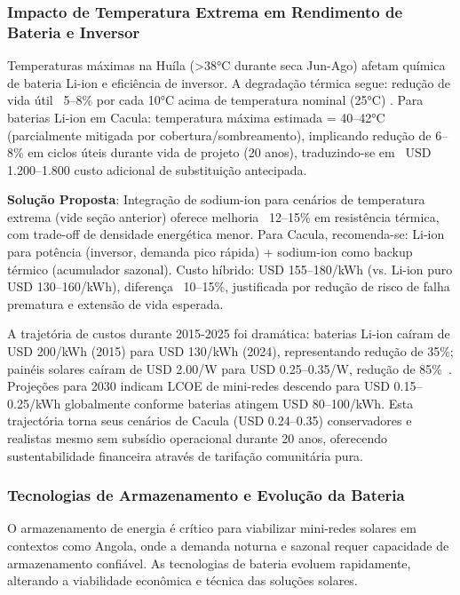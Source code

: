 \documentclass[12pt, a4paper]{article}
\begin{document}
\subsubsection{Impacto de Temperatura Extrema em Rendimento de Bateria e Inversor}

Temperaturas máximas na Huíla (>38°C durante seca Jun-Ago) afetam química de bateria Li-ion e eficiência de inversor. A degradação térmica segue: redução de vida útil ~5--8\% por cada 10°C acima de temperatura nominal (25°C) \citep{Mukhopadhyay2025}. Para baterias Li-ion em Cacula: temperatura máxima estimada = 40--42°C (parcialmente mitigada por cobertura/sombreamento), implicando redução de 6--8\% em ciclos úteis durante vida de projeto (20 anos), traduzindo-se em ~USD 1.200--1.800 custo adicional de substituição antecipada.

\textbf{Solução Proposta}: Integração de sodium-ion para cenários de temperatura extrema (vide seção anterior) oferece melhoria ~12--15\% em resistência térmica, com trade-off de densidade energética menor. Para Cacula, recomenda-se: Li-ion para potência (inversor, demanda pico rápida) + sodium-ion como backup térmico (acumulador sazonal). Custo híbrido: USD 155--180/kWh (vs. Li-ion puro USD 130--160/kWh), diferença ~10--15\%, justificada por redução de risco de falha prematura e extensão de vida esperada.

A trajetória de custos durante 2015-2025 foi dramática: baterias Li-ion caíram de USD 200/kWh (2015) para USD 130/kWh (2024), representando redução de 35\%; painéis solares caíram de USD 2.00/W para USD 0.25--0.35/W, redução de 85\%~\citep{Schmidt2021}. Projeções para 2030 indicam LCOE de mini-redes descendo para USD 0.15--0.25/kWh globalmente conforme baterias atingem USD 80--100/kWh. Esta trajectória torna seus cenários de Cacula (USD 0.24--0.35) conservadores e realistas mesmo sem subsídio operacional durante 20 anos, oferecendo sustentabilidade financeira através de tarifação comunitária pura.

\subsubsection{Tecnologias de Armazenamento e Evolução da Bateria}

O armazenamento de energia é crítico para viabilizar mini-redes solares em contextos como Angola, onde a demanda noturna e sazonal requer capacidade de armazenamento confiável. As tecnologias de bateria evoluem rapidamente, alterando a viabilidade econômica e técnica das soluções solares.
\end{document}
